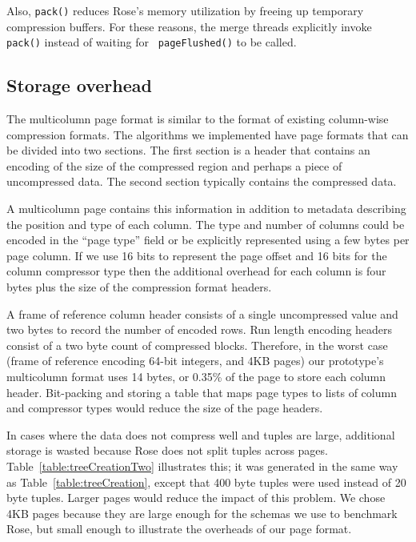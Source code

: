 \documentclass{vldb}
\newcommand{\rows}{Rose\xspace}
\newcommand{\rowss}{Rose's\xspace}
\begin{document}
Also, {\tt pack()} reduces \rowss memory utilization by freeing up
temporary compression buffers.
For these reasons, the merge threads
explicitly invoke {\tt pack()} instead of waiting for {\tt
  pageFlushed()} to be called.


\subsection{Storage overhead}

The multicolumn page format is similar to the format of existing
column-wise compression formats.  The algorithms we implemented have
page formats that can be divided into two sections.
The first section is a header that contains an encoding of the size of
the compressed region and perhaps a piece of uncompressed data.  The second section
typically contains the compressed data.

A multicolumn page contains this information in addition to metadata
describing the position and type of each column.  The type and number
of columns could be encoded in the ``page type'' field or be
explicitly represented using a few bytes per page column.  If we use
16 bits to represent the page offset and 16 bits for the column
compressor type then the additional overhead for each
column is four bytes plus the size of the compression format headers.

A frame of reference column header consists of a single uncompressed
value and two bytes to record the number of encoded rows.  Run
length encoding headers consist of a two byte count of compressed
blocks.  Therefore, in the worst case (frame of reference encoding
64-bit integers, and 4KB pages) our prototype's multicolumn format
uses 14 bytes, or 0.35\% of the page to store each column header.
Bit-packing and
storing a table that maps page types to lists of column and compressor
types would reduce the size of the page headers.

In cases where the data does not compress well and tuples are large, additional
storage is wasted because \rows does not split tuples across
pages.  Table~\ref{table:treeCreationTwo} illustrates this; it was
generated in the same way as Table~\ref{table:treeCreation}, except
that 400 byte tuples were used instead of 20 byte tuples.  Larger
pages would reduce the impact of this problem.  We chose 4KB pages
because they are large enough for the schemas we use to benchmark
\rows, but small enough to illustrate the overheads of our page
format.
\end{document}
